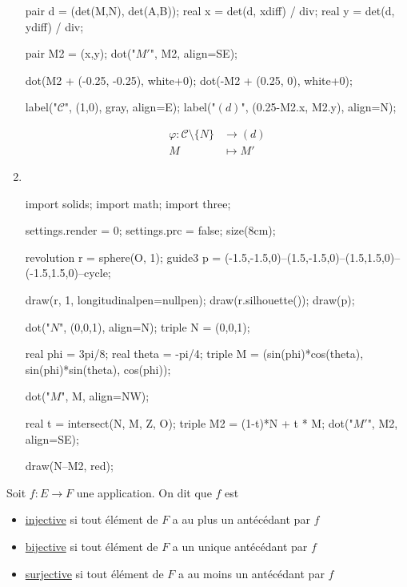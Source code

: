 \begin{exm}
\begin{enumerate}
\begin{center}
\begin{asy}
					pair d = (det(M,N), det(A,B));
					real x = det(d, xdiff) / div;
					real y = det(d, ydiff) / div;

					pair M2 = (x,y);
					dot("$M'$", M2, align=SE);

					dot(M2 + (-0.25, -0.25), white+0);
					dot(-M2 + (0.25, 0), white+0);

					label("$\mathcal{C}$", (1,0), gray, align=E);
					label("$(d)$", (0.25-M2.x, M2.y), align=N);
				\end{asy}
			\end{center}
			\begin{align*}
				\varphi: \mathcal{C}\setminus \{N\}  &\longrightarrow (d) \\
				M &\longmapsto M'
			\end{align*}
		\item~\\
			\begin{center}
				\begin{asy}
					import solids;
					import math;
					import three;

					settings.render = 0;
					settings.prc = false;
					size(8cm);

					revolution r = sphere(O, 1);
					guide3 p = (-1.5,-1.5,0)--(1.5,-1.5,0)--(1.5,1.5,0)--(-1.5,1.5,0)--cycle;

					draw(r, 1, longitudinalpen=nullpen);
					draw(r.silhouette());
					draw(p);

					dot("$N$", (0,0,1), align=N);
					triple N = (0,0,1);

					real phi = 3pi/8; real theta = -pi/4;
					triple M = (sin(phi)*cos(theta), sin(phi)*sin(theta), cos(phi));

					dot("$M$", M, align=NW);

					real t = intersect(N, M, Z, O);
					triple M2 = (1-t)*N + t * M;
					dot("$M'$", M2, align=SE);

					draw(N--M2, red);
				\end{asy}
			\end{center}
	\end{enumerate}
\end{exm}

\begin{defn}
	Soit $f: E \to F$ une application. On dit que $f$ est
	\begin{itemize}
		\item \underline{injective} si tout élément de $F$ a au plus un antécédant par $f$
		\item \underline{bijective} si tout élément de $F$ a un unique antécédant par $f$
		\item \underline{surjective} si tout élément de $F$ a au moins un antécédant par $f$
	\end{itemize}
\end{defn}

